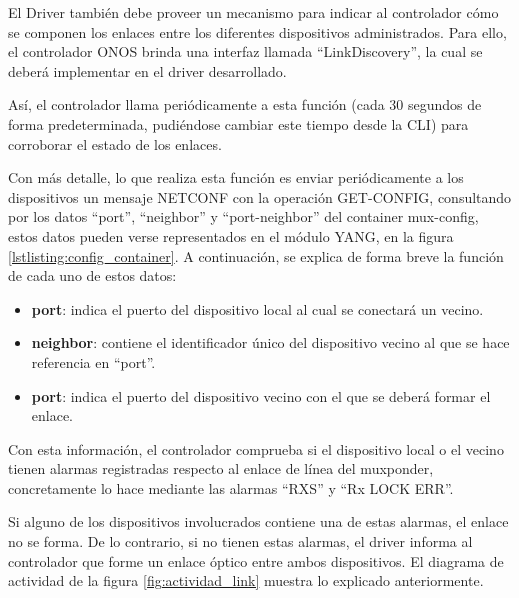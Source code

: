 El Driver también debe proveer un mecanismo para indicar al controlador cómo se componen los enlaces entre los diferentes dispositivos administrados. Para ello, el controlador ONOS brinda una interfaz llamada “LinkDiscovery”, la cual se deberá implementar en el driver desarrollado. 

Así, el controlador llama periódicamente a esta función (cada 30 segundos de forma predeterminada, pudiéndose cambiar este tiempo desde la CLI) para corroborar el estado de los enlaces. 

Con más detalle, lo que realiza esta función es enviar periódicamente a los dispositivos un mensaje NETCONF con la operación GET-CONFIG, consultando por los datos “port”, “neighbor” y “port-neighbor” del container mux-config, estos datos pueden verse representados en el módulo YANG, en la figura \ref{lstlisting:config_container}. A continuación, se explica de forma breve la función de cada uno de estos datos:

\begin{itemize}
	\item \textbf{port}: indica el puerto del dispositivo local al cual se conectará un vecino.
    
    \item \textbf{neighbor}: contiene el identificador único del dispositivo vecino al que se hace referencia en “port”.
    
    \item \textbf{port}: indica el puerto del dispositivo vecino con el que se deberá formar el enlace.
\end{itemize}

Con esta información, el controlador comprueba si el dispositivo local o el vecino tienen alarmas registradas respecto al enlace de línea del muxponder, concretamente lo hace mediante las alarmas “RXS” y “Rx LOCK ERR”. 

Si alguno de los dispositivos involucrados contiene una de estas alarmas, el enlace no se forma. De lo contrario, si no tienen estas alarmas, el driver informa al controlador que forme un enlace óptico entre ambos dispositivos. El diagrama de actividad de la figura \ref{fig:actividad_link} muestra lo explicado anteriormente.

